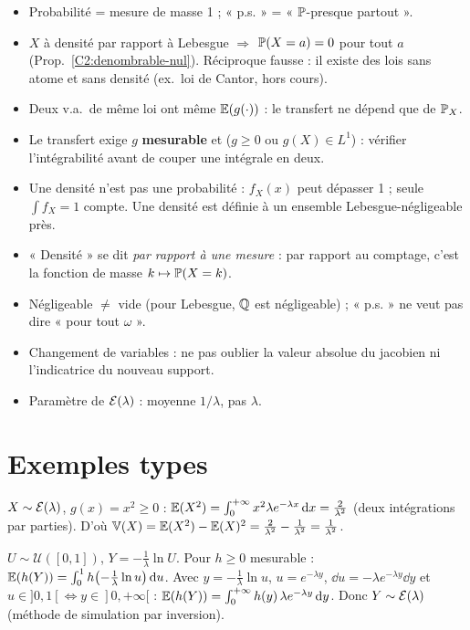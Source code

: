 \documentclass[11pt,a4paper]{article}
\begin{document}
\begin{liens}
\begin{itemize}
  \item Probabilité = mesure de masse 1 ; « p.s. » = « $\mathbb{P}$-presque partout ».
  \item $X$ à densité par rapport à Lebesgue $\Rightarrow$ $\mathbb{P}(X=a)=0$ pour tout $a$ (Prop.~\ref{C2:denombrable-nul}).
  Réciproque fausse : il existe des lois sans atome et sans densité (ex.\ loi de Cantor, hors cours).
  \item Deux v.a.\ de même loi ont même $\mathbb{E}(g(\cdot))$ : le transfert ne dépend que de $\mathbb{P}_X$.
\end{itemize}
\end{liens}

\begin{piege}
\begin{itemize}
  \item Le transfert exige $g$ \textbf{mesurable} et ($g\ge0$ ou $g(X)\in L^1$) : vérifier l'intégrabilité avant de couper une intégrale en deux.
  \item Une densité n'est pas une probabilité : $f_X(x)$ peut dépasser 1 ; seule $\int f_X=1$ compte. Une densité est
  définie à un ensemble Lebesgue-négligeable près.
  \item « Densité » se dit \emph{par rapport à une mesure} : par rapport au comptage, c'est la fonction de masse $k\mapsto\mathbb{P}(X=k)$.
  \item Négligeable $\neq$ vide (pour Lebesgue, $\mathbb{Q}$ est négligeable) ; « p.s. » ne veut pas dire « pour tout $\omega$ ».
  \item Changement de variables : ne pas oublier la valeur absolue du jacobien ni l'indicatrice du nouveau support.
  \item Paramètre de $\mathcal{E}(\lambda)$ : moyenne $1/\lambda$, pas $\lambda$.
\end{itemize}
\end{piege}

\section*{Exemples types}

\begin{exemple}\label{C2:ex1}
$X\sim\mathcal{E}(\lambda)$, $g(x)=x^2\ge0$ :
$\mathbb{E}(X^2)=\int_0^{+\infty}x^2\lambda e^{-\lambda x}\,\mathrm{d} x=\frac{2}{\lambda^2}$ (deux intégrations par parties).
D'où $\operatorname{\mathbb{V}}(X)=\mathbb{E}(X^2)-\mathbb{E}(X)^2=\frac2{\lambda^2}-\frac1{\lambda^2}=\frac1{\lambda^2}$.
\end{exemple}

\begin{exemple}\label{C2:ex2}
$U\sim\mathcal U([0,1])$, $Y=-\frac1\lambda\ln U$. Pour $h\ge0$ mesurable :
$\mathbb{E}(h(Y))=\int_0^1h\bigl(-\tfrac1\lambda\ln u\bigr)\,\mathrm{d} u$. Avec $y=-\frac1\lambda\ln u$, $u=e^{-\lambda y}$,
$\dd u=-\lambda e^{-\lambda y}\dd y$ et $u\in]0,1[\iff y\in]0,+\infty[$ :
$\mathbb{E}(h(Y))=\int_0^{+\infty}h(y)\,\lambda e^{-\lambda y}\,\mathrm{d} y$. Donc $Y\sim\mathcal{E}(\lambda)$ (méthode de simulation par inversion).
\end{exemple}
\end{document}
